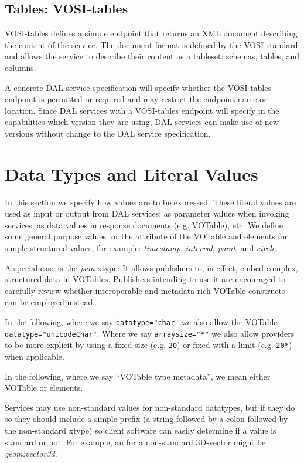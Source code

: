 \documentclass[11pt,letter]{ivoa}
\begin{document}
\subsection{Tables: VOSI-tables}
\label{sec:vosi-tables}
VOSI-tables \citep{2017ivoa.spec.0524G} defines a simple endpoint that returns an
XML document
describing the content of the service. The document format is defined by the
VOSI \citep{2017ivoa.spec.0524G} standard and allows the service to
describe their content
as a tableset: schemas, tables, and columns.

A concrete DAL service specification will specify whether the VOSI-tables endpoint is
permitted or required and may restrict the endpoint name or location.
Since DAL services with a VOSI-tables endpoint will specify
in the capabilities which version they are using, DAL services can make use of
new versions without change to the DAL service specification.

\section{Data Types and Literal Values}
\label{sec:xtypes}
In this section we specify how values are to be expressed. These literal values
are used as input or output from DAL services: as parameter values when
invoking services, as data values in response documents (e.g. VOTable),
etc. We define some general purpose values for the  attribute of
the VOTable  and  elements for simple
structured values, for example: \emph{timestamp}, \emph{interval}, \emph{point},
and \emph{circle}.

A special case is the \emph{json} xtype: It allows publishers to, in
effect, embed complex, structured data in VOTables.  Publishers
intending to use it are encouraged to carefully review whether
interoperable and metadata-rich VOTable constructs can be employed
instead.

In the following, where we say \verb|datatype="char"| we also allow the VOTable
\verb|datatype="unicodeChar"|. Where we say \verb|arraysize="*"| we also allow
providers to be more explicit by using a fixed size (e.g. \verb|20|) or fixed
with a limit (e.g. \verb|20*|) when applicable.

In the following, where we say ``VOTable type metadata'', we mean either VOTable
 or  elements.

Services may use non-standard  values for non-standard datatypes, but if they
do so they should include a simple prefix (a string followed by a colon
followed by the non-standard xtype) so client software can easily determine
if a value is standard or not. For example, an  for a
non-standard 3D-vector might be \emph{geom:vector3d}.
\end{document}
